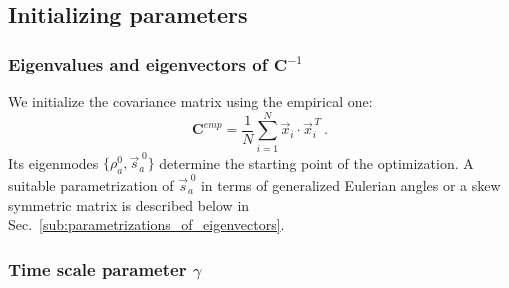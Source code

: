 \documentclass[preprint,amsmath,amssymb,superscriptaddress,showpacs,pre]{revtex4-1}
\let\originalleft\left
\let\originalright\right
\renewcommand{\left}{\mathopen{}\mathclose\bgroup\originalleft}
\renewcommand{\right}{\aftergroup\egroup\originalright}
\def\vx{\vec x}
\newcommand{\vsa}{\vec{s}_a}
\begin{document}

\subsection{Initializing parameters} %
\label{sub:initializing_parameters}

\subsubsection{Eigenvalues and eigenvectors of $\mathbf{C}^{-1}$}
\label{ssub:eigenvalues_and_eigenvectors}

We initialize the covariance matrix using the empirical one:
\begin{equation*}
	\mathbf{C}^{emp} = \frac{1}{N}\sum_{i=1}^{N}\vx_i \cdot\vx_i^{\,T}\ .
\end{equation*}
Its eigenmodes $\{\rho^0_a, \vsa^{\;0}\}$ determine the starting point of the optimization. A suitable parametrization of $\vsa^{\;0}$ in terms of generalized Eulerian angles or a skew symmetric matrix is described below in Sec.~\ref{sub:parametrizations_of_eigenvectors}.
	




\subsubsection{Time scale parameter $\gamma$}
\end{document}
